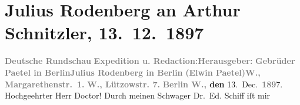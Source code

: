 

         
         \renewcommand{\erwaehntePersonen}{Personen: Elwin Paetel, Julius Rodenberg, Eduard Liberius Schiff}
         \renewcommand{\erwaehnteInstitutionen}{Institutionen: Deutsche Rundschau, Gebrüder Paetel Verlag}
         \renewcommand{\erwaehnteOrte}{Orte: Berlin, Lützowstraße, Margaretenstraße, Wien}
         \renewcommand{\erwaehnteWerke}{}
               \section[Julius Rodenberg an Arthur Schnitzler, 13. 12. 1897]{ Julius Rodenberg an Arthur Schnitzler, 13. 12. 1897}\nopagebreak{}\rehead{ }\begin{ledgroupsized}[t]{13cm}\normalsize\beginnumbering \toendnotes[C]{\smallbreak\pagebreak[2]} 
\pstart
           \noindent{}\centering{}{\pb}\textcolor{gray}{\textbf{Deutsche Rundschau}}\pend
           \pstart
           \noindent{}\textcolor{gray}{\textbf{Expedition u. Redaction:}}\hfill \textcolor{gray}{\textbf{Herausgeber:}}\pend
           \pstart
           \textcolor{gray}{\textbf{Gebrüder Paetel in Berlin}}\hfill \textcolor{gray}{\textbf{Julius Rodenberg in Berlin}}\pend
           \pstart
           \textcolor{gray}{\textbf{(Elwin Paetel)}}\hfill \textcolor{gray}{\textbf{W., Margarethenstr. 1.}}\pend
           \pstart
           \textcolor{gray}{\textbf{W., Lützowstr. 7.}}\pend
           \pstart
           \raggedleft{}\textbf{\textcolor{gray}{\textbf{Berlin W.,}} den}{ }13. Dec. \textcolor{gray}{\textbf{189}}7.\pend
           \pstart{}Hochgeehrter Herr Doctor!\pend\pstart
           Durch meinen Schwager Dr. Ed. Schiff iſt mir

\end{ledgroupsized}
